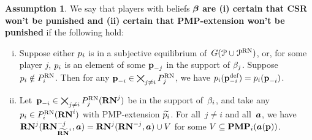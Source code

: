 \documentclass[sigconf]{aamas}
\newcommand{\allprogreneg}{\allprog^{\text{RN}}}
\theoremstyle{definition}
\newtheorem{assumption}[definition]{Assumption}
\begin{document}
\begin{assumption}
     We say that 
     players 
     with beliefs $\boldsymbol{\beta}$ 
     \textbf{are (i) certain that CSR won't be punished and (ii) certain that PMP-extension won't be punished} 
     if the following hold:
     \begin{enumerate}[(i)]
      \item Suppose either $p_i$ is in a subjective equilibrium
     of~$\game(\allprog \cup \allprogreneg)$,
     or, for some player $j$, $p_i$ is an element of some $\textbf{p}_{-j}$ in the support of $\beta_j$.
      Suppose $p_i \notin P_i^{\textnormal{RN}}$. 
         Then for any $\textbf{p}_{-i} \in \bigtimes_{j \neq i} P_j^{\textnormal{RN}}$,
         we have 
         $p_i({\textbf{p}}^{\textnormal{def}}_{-i}) = p_i(\textbf{p}_{-i})$.
         \label{subassum:csrwlog}
         \item Let~$\textbf{p}_{-i} \in \bigtimes_{j \neq i} P_j^{\textnormal{RN}}(\mathbf{RN}^{j})$ be in the
     support of~$\beta_i$,
     and take any~$p_i \in P_i^{\textnormal{RN}}(\mathbf{RN}^{i})$
     with PMP-extension $\widetilde{p_i}$.
         For all~$j \neq i$ and all~$\boldsymbol{a}$, we have
     $\mathbf{RN}^{j}(\mathbf{RN}^{-j}_{{\widetilde{\mathbf{RN}}}^{i}},\boldsymbol{a}) = \mathbf{RN}^{j}(\mathbf{RN}^{-j},\boldsymbol{a}) \cup 
     {V}$ for some ${V} \subseteq \mathbf{PMP}_i(\boldsymbol{a}(\textbf{p}))$. \label{subassum:extension}
     \end{enumerate}
     
      \label{assum:nopunish}
\end{assumption}
\end{document}
